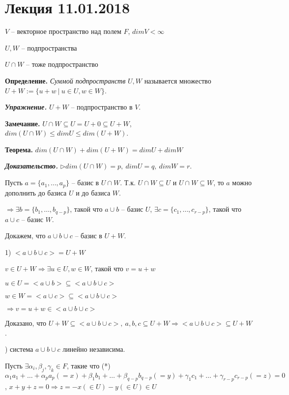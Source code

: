 \section{Лекция 11.01.2018}

$V$ -- векторное пространство над полем $F$, $dimV < \infty$

$U, W$ -- подпространства

$U \cap W$ -- тоже подпространство

\bigskip
\textbf{Определение.} \textit{Суммой подпространств} $U, W$ называется множество $U + W := \{ u + w \ | \ u \in U, w \in W \}$.

\bigskip
\textit{\textbf{Упражнение.}} $U + W$ -- подпространство в $V$.

\bigskip
\textbf{Замечание.} $U \cap W \subseteq U = U + 0 \subseteq U + W$, $dim(U \cap W) \leq dimU \leq dim(U + W)$.

\bigskip
\textbf{Теорема.} $dim(U \cap W) + dim(U + W) = dimU + dimW$

\bigskip
\textbf{\textit{Доказательство.}} $\rhd dim(U \cap W) = p, \ dimU = q, \ dimW = r$. 

Пусть $a = \{a_1, \dots, a_p\}$ -- базис в $U \cap W$. Т.к. $U \cap W \subseteq U$ и $U \cap W \subseteq W$, то $a$ можно дополнить до базиса $U$ и до базиса $W$.

$\Rightarrow \exists b = \{b_1, \dots, b_{q-p}\}$, такой что $a \cup b$ -- базис $U$, $\exists c = \{c_1, \dots, c_{r-p}\}$, такой что $a \cup c$ -- базис $W$.

Докажем, что $a \cup b \cup c$ -- базис в $U + W$.

1) $<a \cup b \cup c> = U + W$

$v \in U + W \Rightarrow \exists u \in U, w \in W$, такой что $v = u + w$

$u \in U = <a \cup b> \subseteq <a \cup b \cup c>$

$w \in W = <a \cup c> \subseteq <a \cup b \cup c>$

$\Rightarrow v = u + w \in <a \cup b \cup c>$

Доказано, что $U + W \subseteq <a \cup b \cup c>, \ a, b, c \subseteq U + W \Rightarrow <a \cup b \cup c> \subseteq U + W$.

) система $a \cup b \cup c$ линейно независима. 

Пусть $\exists \alpha_i, \beta_j, \gamma_k \in F$, такие что (*) $\alpha_1 a_1 + \dots + \alpha_p a_p (=x) + \beta_1 b_1 + \dots + \beta_{q-p} b_{q-p} (=y) + \gamma_1 c_1 + \dots + \gamma_{r-p} c_{r-p} (=z) = 0$, $x + y + z = 0 \Rightarrow z = - x (\in U) - y (\in U) \in U$

